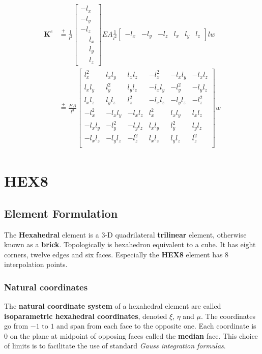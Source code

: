 \documentclass[10pt,b5paper,titlepage]{book}
\newcommand{\m}{\mathbf}
\newcommand*\eqp{\stackrel{+}{=}}
\newenvironment{eqarray}
{
    \begin{eqnarray}
        \begin{aligned}
}
{
        \end{aligned}
    \end{eqnarray}
}
\begin{document}
\begin{eqarray}
    \m{K}^e &\eqp
    \frac{1}{l^2}
    \begin{bmatrix}
        -l_x \\
        -l_y \\
        -l_z \\
        \phantom{-}l_x \\
        \phantom{-}l_y \\
        \phantom{-}l_z
    \end{bmatrix}
    EA
    \frac{1}{l^2}
    \begin{bmatrix}
        -l_x & -l_y & -l_z & l_x & l_y & l_z
    \end{bmatrix}
    l w \\
    &\eqp
    \frac{EA}{l^3}
    \begin{bmatrix}
        l_x^2 & l_x l_y & l_x l_z & -l_x^2 & -l_x l_y & -l_x l_z \\
        l_x l_y & l_y^2 & l_y l_z & -l_x l_y & -l_y^2 & -l_y l_z \\
        l_x l_z & l_y l_z & l_z^2 & -l_x l_z & -l_y l_z & -l_z^2 \\
        -l_x^2 & -l_x l_y & -l_x l_z & l_x^2 & l_x l_y & l_x l_z \\
        -l_x l_y & -l_y^2 & -l_y l_z & l_x l_y & l_y^2 & l_y l_z \\
        -l_x l_z & -l_y l_z & -l_z^2 & l_x l_z & l_y l_z & l_z^2 \\
    \end{bmatrix} w
\end{eqarray}




\newpage
\section{HEX8}

\subsection{Element Formulation}

The \textbf{Hexahedral} element is a 3-D quadrilateral \textbf{trilinear}
element, otherwise known as a \textbf{brick}. Topologically is hexahedron
equivalent to a cube. It has eight corners, twelve edges and six faces.
Especially the \textbf{HEX8} element has 8 interpolation points.

\subsubsection{Natural coordinates}
The \textbf{natural coordinate system} of a hexahedral element are called
\textbf{isoparametric hexahedral coordinates}, denoted $ \xi $, $ \eta $ and $ \mu $.
The coordinates go from $ -1 $ to $ 1 $ and span from each face to the opposite one.
Each coordinate is 0 on the plane at midpoint of opposing faces called the
\textbf{median} face. This choice of limits is to facilitate the use of standard
\textit{Gauss integration formulas}.
\end{document}
